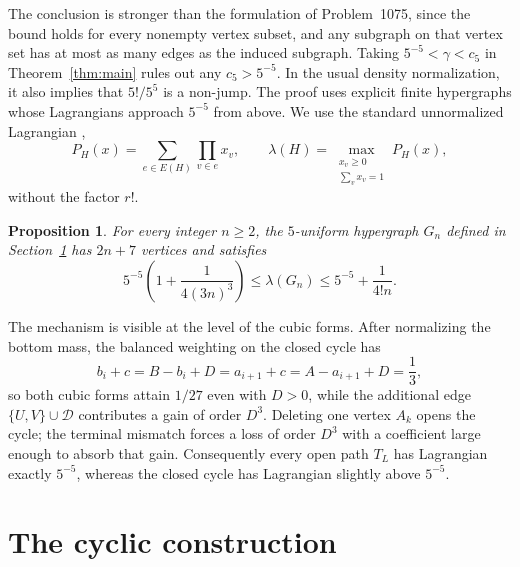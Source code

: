 \documentclass[11pt]{article}
\newtheorem{proposition}[theorem]{Proposition}
\numberwithin{equation}{section}
\newcommand{\D}{\mathcal D}
\begin{document}
The conclusion is stronger than the formulation of Problem~1075,
since the bound holds for every nonempty vertex subset, and any
subgraph on that vertex set has at most as many edges as the induced subgraph.
Taking \(5^{-5}<\gamma<c_{5}\) in Theorem~\ref{thm:main}
rules out any \(c_{5}>5^{-5}\). In the usual density normalization,
it also implies that \(5!/5^{5}\) is a non-jump. The proof uses
explicit finite hypergraphs whose Lagrangians approach \(5^{-5}\)
from above. We use the standard unnormalized Lagrangian
\cite{MotzkinStraus65,Keevash11},
\begin{equation}\label{eq:lagrangian}
 P_H(x)=\sum_{e\in E(H)}\prod_{v\in e}x_v,
 \qquad
 \lambda(H)=\max_{\substack{x_v\ge0\\\sum_vx_v=1}}P_H(x),
\end{equation}
without the factor \(r!\).

\begin{proposition}\label{prop:sequence}
For every integer \(n\ge2\), the \(5\)-uniform hypergraph \(G_n\)
defined in Section~\ref{sec:construction} has \(2n+7\) vertices and
satisfies
\begin{equation}\label{eq:bounds}
 5^{-5}\left(1+\frac1{4(3n)^{3}}\right)
 \le\lambda(G_n)\le5^{-5}+\frac1{4!n}.
\end{equation}
\end{proposition}

The mechanism is visible at the level of the cubic forms. After
normalizing the bottom mass, the balanced weighting on the closed cycle
has
\[
 b_i+c=B-b_i+D=a_{i+1}+c=A-a_{i+1}+D=\frac13,
\]
so both cubic forms attain \(1/27\) even with \(D>0\), while the
additional edge \(\{U,V\}\cup\D\) contributes a gain of order
\(D^{3}\). Deleting one vertex \(A_k\) opens the cycle; the
terminal mismatch forces a loss of order \(D^3\) with a coefficient
large enough to absorb that gain. Consequently every open path \(T_L\) has Lagrangian
exactly \(5^{-5}\), whereas the closed cycle has Lagrangian slightly
above \(5^{-5}\).

\section{The cyclic construction}\label{sec:construction}
\end{document}
